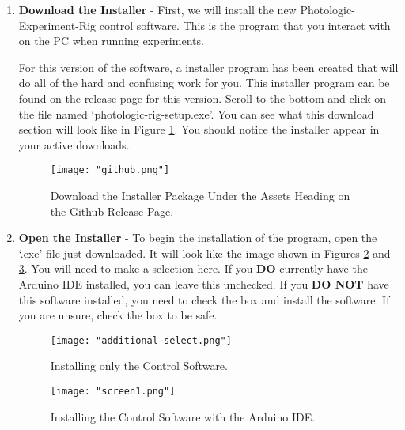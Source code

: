 \documentclass{article}
\begin{document}
\begin{enumerate}
    \item \textbf{Download the Installer} - First, we will install the new Photologic-Experiment-Rig control software. This is the program that you interact with on the PC when running experiments. 
        \par For this version of the software, 
        a installer program has been created that will do all of the hard and confusing work for you. This installer program can be found 
        \href{https://github.com/blakehourigan/Photologic-Experiment-Rig/releases/tag/v1.0}{on the release page for this version.}  Scroll to the bottom and click on the file named `photologic-rig-setup.exe'. 
        You can see what this download section will look like in Figure \ref{fig:github}. You should notice the installer appear in your active downloads.

        \begin{figure}[h!]
            \centering
            \texttt{[image: "github.png"]}
            \caption{Download the Installer Package Under the Assets Heading on the Github Release Page.}
            \label{fig:github}
        \end{figure}

        \newpage    
    \item \textbf{Open the Installer} - To begin the installation of the program, open the `.exe' file just downloaded. It will look like the image shown in Figures \ref{fig:cont-ide}
        and \ref{fig:cont-no-ide}. You will need to make a selection here. If you \textbf{DO} currently have the Arduino IDE installed, you can leave this unchecked. If you \textbf{DO NOT}
        have this software installed, you need to check the box and install the software. If you are unsure, check the box to be safe.

        \begin{figure}[h!]
            \centering
            \texttt{[image: "additional-select.png"]}
            \caption{Installing only the Control Software.}
            \label{fig:cont-ide}
        \end{figure}

        \begin{figure}[h!]
            \centering
            \texttt{[image: "screen1.png"]}
            \caption{Installing the Control Software with the Arduino IDE.}
            \label{fig:cont-no-ide}
        \end{figure}
        \FloatBarrier


\end{enumerate}
\end{document}
